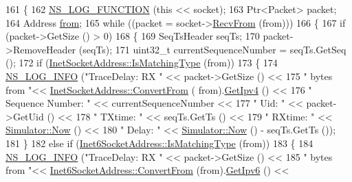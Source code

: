 \begin{DoxyCode}
161 \{
162   \hyperlink{log-macros-disabled_8h_a90b90d5bad1f39cb1b64923ea94c0761}{NS\_LOG\_FUNCTION} (\textcolor{keyword}{this} << socket);
163   Ptr<Packet> packet;
164   Address \hyperlink{lte__amc_8m_a1b4c81ff74eb1a626b5ade44c81004b3}{from};
165   \textcolor{keywordflow}{while} ((packet = socket->\hyperlink{classns3_1_1Socket_af22378d7af9a2745a9eada20210da215}{RecvFrom} (from)))
166     \{
167       \textcolor{keywordflow}{if} (packet->GetSize () > 0)
168         \{
169           SeqTsHeader seqTs;
170           packet->RemoveHeader (seqTs);
171           uint32\_t currentSequenceNumber = seqTs.GetSeq ();
172           \textcolor{keywordflow}{if} (\hyperlink{classns3_1_1InetSocketAddress_a9426766e34e928ce5dbdbeb9563a10df}{InetSocketAddress::IsMatchingType} (from))
173             \{
174               \hyperlink{group__logging_gafbd73ee2cf9f26b319f49086d8e860fb}{NS\_LOG\_INFO} (\textcolor{stringliteral}{"TraceDelay: RX "} << packet->GetSize () <<
175                            \textcolor{stringliteral}{" bytes from "}<< \hyperlink{classns3_1_1InetSocketAddress_ade776b1109e7b9a7be0b22ced49931e3}{InetSocketAddress::ConvertFrom} (
      from).\hyperlink{classns3_1_1InetSocketAddress_a925d5288448467062884ce0363a63658}{GetIpv4} () <<
176                            \textcolor{stringliteral}{" Sequence Number: "} << currentSequenceNumber <<
177                            \textcolor{stringliteral}{" Uid: "} << packet->GetUid () <<
178                            \textcolor{stringliteral}{" TXtime: "} << seqTs.GetTs () <<
179                            \textcolor{stringliteral}{" RXtime: "} << \hyperlink{classns3_1_1Simulator_ac3178fa975b419f7875e7105be122800}{Simulator::Now} () <<
180                            \textcolor{stringliteral}{" Delay: "} << \hyperlink{classns3_1_1Simulator_ac3178fa975b419f7875e7105be122800}{Simulator::Now} () - seqTs.GetTs ());
181             \}
182           \textcolor{keywordflow}{else} \textcolor{keywordflow}{if} (\hyperlink{classns3_1_1Inet6SocketAddress_a4d928c54affbfb530a12076d6d7e0540}{Inet6SocketAddress::IsMatchingType} (from))
183             \{
184               \hyperlink{group__logging_gafbd73ee2cf9f26b319f49086d8e860fb}{NS\_LOG\_INFO} (\textcolor{stringliteral}{"TraceDelay: RX "} << packet->GetSize () <<
185                            \textcolor{stringliteral}{" bytes from "}<< \hyperlink{classns3_1_1Inet6SocketAddress_a2177c66e1bcf17c85dcffb9d2a971f5a}{Inet6SocketAddress::ConvertFrom} 
      (from).\hyperlink{classns3_1_1Inet6SocketAddress_a19c83458e1e61d5accd19bec5afb254e}{GetIpv6} () <<

\end{DoxyCode}
